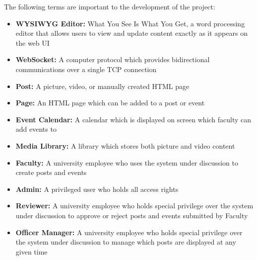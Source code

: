 The following terms are important to the development of the project:
\begin{itemize}
    \item \textbf{WYSIWYG Editor:} What You See Is What You Get, a word processing editor that allows users to view and update content exactly as it appears on the web UI
    \item \textbf{WebSocket:} A computer protocol which provides bidirectional communications over a single TCP connection
    \item \textbf{Post:} A picture, video, or manually created HTML page
    \item \textbf{Page:} An HTML page which can be added to a post or event
    \item \textbf{Event Calendar:} A calendar which is displayed on screen which faculty can add events to
    \item \textbf{Media Library:} A library which stores both picture and video content
    \item \textbf{Faculty:} A university employee who uses the system under discussion to create posts and events
    \item \textbf{Admin:} A privileged user who holds all access rights
    \item \textbf{Reviewer:} A university employee who holds special privilege over the system under discussion to approve or reject posts and events submitted by Faculty
    \item \textbf{Officer Manager:} A university employee who holds special privilege over the system under discussion to manage which posts are displayed at any given time
\end{itemize}